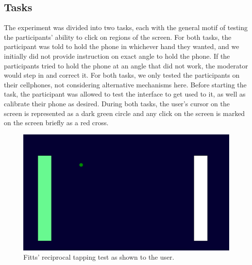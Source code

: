 \subsection{Tasks}

The experiment was divided into two tasks, each with the general motif of testing
the participants' ability to click on regions of the screen. For both tasks, the
participant was told to hold the phone in whichever hand they wanted, and we
initially did not provide instruction on exact angle to hold the phone. If the
participants tried to hold the phone at an angle that did not work, the moderator
would step in and correct it. For both tasks, we only tested the participants
on their cellphones, not considering alternative mechanisms here. Before starting
the task, the participant was allowed to test the interface to get used to it,
as well as calibrate their phone as desired. During both tasks, the user's
cursor on the screen is represented as a dark green circle and any click on the
screen is marked on the screen briefly as a red cross.

\begin{figure}
\centering
  \includegraphics[width=0.6\columnwidth]{chapters/03_muifold/figures/user_study_fitts.png}
  \caption{Fitts' reciprocal tapping test as shown to the user.}
  \label{fig:user_study_fitts}
\end{figure}


